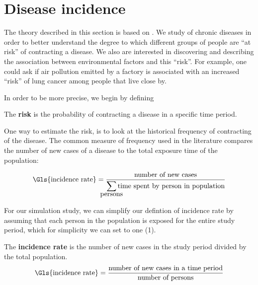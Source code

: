 

%
%
\section{Disease incidence}
\label{sec:theory:incidence}

The theory described in this section is based on \citet{rothman2008modern}.
We study of chronic diseases in order to better understand the degree to which different groups of people are ``at risk'' of contracting a disease.
We also are interested in discovering and describing the association between environmental factors and this ``risk''.
For example, one could ask if air pollution emitted by a factory is associated with an increased ``risk'' of lung cancer among people that live close by.

In order to be more precise, we begin by defining

\begin{defn}
    The \textbf{risk} is the probability of contracting a disease in a specific time period.
\end{defn}

One way to estimate the risk, is to look at the historical frequency of contracting of the disease.
The common measure of frequency used in the literature compares the number of new cases of a disease to the total exposure time of the population:

\begin{equation}
    \mbox{\Gls{incidence rate}} = \frac{\mbox{number of new cases}}
                                {\displaystyle\smashoperator{\sum\limits_{\mbox{persons}}}\mbox{time spent by person in population}}
\end{equation}

For our simulation study, we can simplify our defintion of \gls{incidence rate} by assuming that each person in the population is exposed for the entire study period,
which for simplicity we can set to one (1).

\begin{defn}
    The \textbf{\gls{incidence rate}} is the number of new cases in the study period divided by the total population.
    \begin{equation}
        \mbox{\Gls{incidence rate}} = \frac{\mbox{number of new cases in a time period}}
                                        {\mbox{number of persons}}
    \end{equation}
\end{defn}

